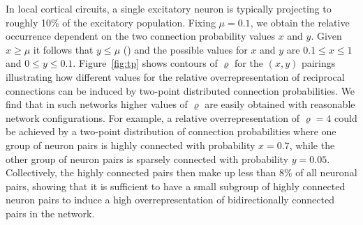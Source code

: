 In local cortical circuits, a single excitatory neuron is typically
projecting to roughly 10\% of the excitatory population.
%
Fixing $\mu = 0.1$, we obtain the relative occurrence dependent on the
two connection probability values $x$ and $y$.
%
Given $x \geq \mu$ it follows that $y \leq \mu$ () and
the possible values for $x$ and $y$ are $0.1 \leq x \leq 1$ and $0
\leq y \leq 0.1$.
%
Figure~\ref{fig:tp} shows contours of $\varrho$ for the $(x,y)$
pairings illustrating how different values for the relative
overrepresentation of reciprocal connections can be induced by
two-point distributed connection probabilities.
%
We find that in such networks higher values of $\varrho$ are easily
obtained with reasonable network configurations. %
%
For example, a relative overrepresentation of $\varrho=4$ could be
achieved by a two-point distribution of connection probabilities where
one group of neuron pairs is highly connected with probability
$x=0.7$, while the other group of neuron pairs is sparsely connected
with probability $y=0.05$.
%
Collectively, the highly connected pairs then make up less than $8\%$
of all neuronal pairs, showing that it is sufficient to have a small
subgroup of highly connected neuron pairs to induce a high
overrepresentation of bidirectionally connected pairs in the network.






